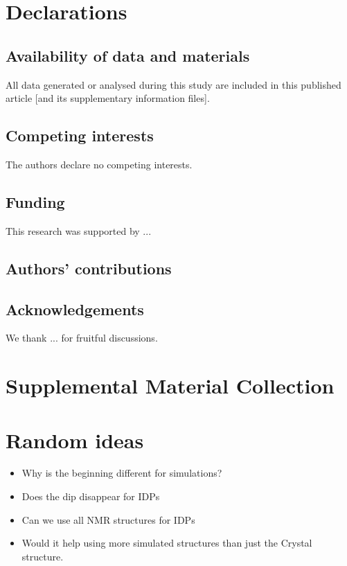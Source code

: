 \documentclass[reprint,amsmath,amssymb,rmp,onecolumn,notitlepage,11pt]{revtex4-1}
\begin{document}
\section*{Declarations}
\subsection{Availability of data and materials}
All data generated or analysed during this study are included in this published article [and its supplementary information files].
\subsection{Competing interests}
The authors declare no competing interests.
\subsection{Funding}
This research was supported by ...
\subsection{Authors' contributions}

\subsection{Acknowledgements}
We thank ... for fruitful discussions.




\appendix
\section{Supplemental Material Collection}
\section{Random ideas}
\begin{itemize}
    \item Why is the beginning different for simulations?
    \item Does the dip disappear for IDPs
    \item Can we use all NMR structures for IDPs
    \item Would it help using more simulated structures than just the Crystal structure. 
\end{itemize}
\end{document}
